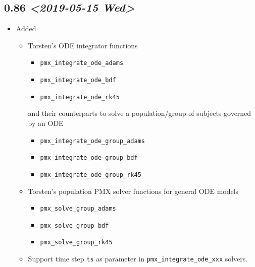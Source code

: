 \documentclass[11pt, reqno, oneside]{amsbook}
\numberwithin{equation}{chapter}
\numberwithin{figure}{chapter}
\numberwithin{table}{chapter}
\theoremstyle{remark}
\begin{document}
\subsection{0.86 \textit{<2019-05-15 Wed>}}
\label{sec:orgb5de0e4}
\begin{itemize}
\item Added
\label{sec:org83f654c}
\begin{itemize}
\item Torsten's ODE integrator functions
\begin{itemize}
\item \texttt{pmx_integrate_ode_adams}
\item \texttt{pmx_integrate_ode_bdf}
\item \texttt{pmx_integrate_ode_rk45}
\end{itemize}
and their counterparts to solve a population/group of
subjects governed by an ODE
\begin{itemize}
\item \texttt{pmx_integrate_ode_group_adams}
\item \texttt{pmx_integrate_ode_group_bdf}
\item \texttt{pmx_integrate_ode_group_rk45}
\end{itemize}
\item Torsten's population PMX solver functions for general
ODE models
\begin{itemize}
\item \texttt{pmx_solve_group_adams}
\item \texttt{pmx_solve_group_bdf}
\item \texttt{pmx_solve_group_rk45}
\end{itemize}
\item Support time step \texttt{ts} as parameter in \texttt{pmx_integrate_ode_xxx}
solvers.
\end{itemize}

\end{itemize}
\end{document}
